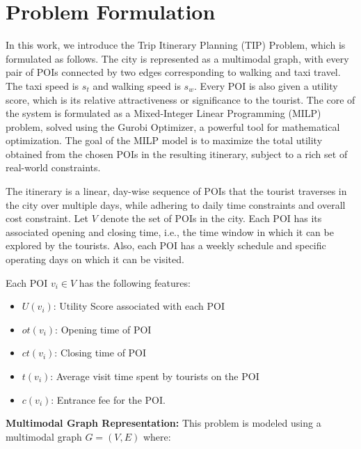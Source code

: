 \section{Problem Formulation}

In this work, we introduce the Trip Itinerary Planning (TIP) Problem, which is formulated as follows. The city is represented as a multimodal graph, with every pair of POIs connected by two edges corresponding to walking and taxi travel. The taxi speed is $s_t$ and walking speed is $s_w$. Every POI is also given a utility score, which is its relative attractiveness or significance to the tourist. The core of the system is formulated as a Mixed-Integer Linear Programming (MILP) problem, solved using the Gurobi Optimizer, a powerful tool for mathematical optimization. The goal of the MILP model is to maximize the total utility obtained from the chosen POIs in the resulting itinerary, subject to a rich set of real-world constraints.

The itinerary is a linear, day-wise sequence of POIs that the tourist traverses in the city over multiple days, while adhering to daily time constraints and overall cost constraint. Let $V$ denote the set of POIs in the city. Each POI has its associated opening and closing time, i.e., the time window in which it can be explored by the tourists. Also, each POI has a weekly schedule and specific operating days on which it can be visited.

Each POI \( v_i \in V \) has the following features:

\begin{itemize}
    \item \( U(v_i) \): Utility Score associated with each POI
    \item \( ot(v_i) \): Opening time of POI
    \item \( ct(v_i) \): Closing time of POI
    \item \( t(v_i) \): Average visit time spent by tourists on the POI
    \item \( c(v_i) \): Entrance fee for the POI.
\end{itemize}

\noindent \textbf{Multimodal Graph Representation:}
This problem is modeled using a multimodal graph \( G = (V, E) \) where:


